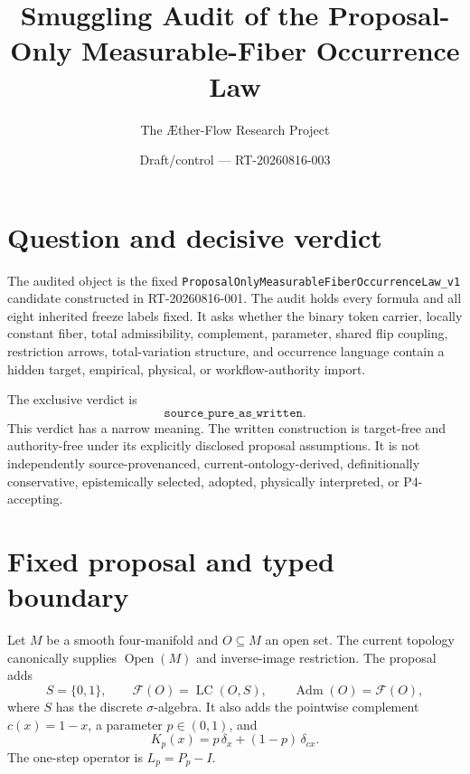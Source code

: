 \documentclass[11pt]{article}
\title{Smuggling Audit of the Proposal-Only Measurable-Fiber Occurrence Law}
\author{The \AE ther-Flow Research Project}
\date{Draft/control --- RT-20260816-003}
\newcommand{\LC}{\operatorname{LC}}
\newcommand{\Adm}{\operatorname{Adm}}
\begin{document}
\maketitle

\begin{center}
\end{center}

\section{Question and decisive verdict}

The audited object is the fixed
\texttt{ProposalOnlyMeasurableFiberOccurrenceLaw\_v1} candidate constructed in
RT-20260816-001. The audit holds every formula and all eight inherited freeze
labels fixed. It asks whether the binary token carrier, locally constant fiber,
total admissibility, complement, parameter, shared flip coupling, restriction
arrows, total-variation structure, and occurrence language contain a hidden
target, empirical, physical, or workflow-authority import.

The exclusive verdict is
\[
  \boxed{\texttt{source\_pure\_as\_written}}.
\]
This verdict has a narrow meaning. The written construction is target-free and
authority-free under its explicitly disclosed proposal assumptions. It is not
independently source-provenanced, current-ontology-derived, definitionally
conservative, epistemically selected, adopted, physically interpreted, or
P4-accepting.

\section{Fixed proposal and typed boundary}

Let $M$ be a smooth four-manifold and $O\subseteq M$ an open set. The current
topology canonically supplies $\operatorname{Open}(M)$ and inverse-image
restriction. The proposal adds
\[
  S=\{0,1\},\qquad \mathcal F(O)=\LC(O,S),\qquad
  \Adm(O)=\mathcal F(O),
\]
where $S$ has the discrete $\sigma$-algebra. It also adds the pointwise
complement $c(x)=1-x$, a parameter $p\in(0,1)$, and
\begin{equation}
  K_p(x)=p\,\delta_x+(1-p)\,\delta_{cx}.
  \label{eq:kernel}
\end{equation}
The one-step operator is $L_p=P_p-I$.
\end{document}
